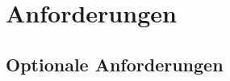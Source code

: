\chapter{Anforderungen}
\label{chap:anf}

	\section{Optionale Anforderungen}
	\label{sec:optionale-anf}